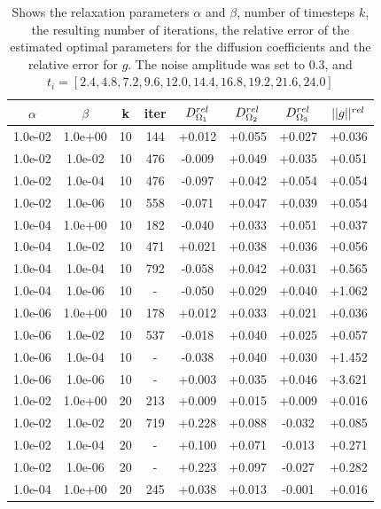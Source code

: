 \documentclass[12pt,a4paper]{article}
\begin{document}
\begin{table}[t]
\centering
\caption{Shows the relaxation parameters $\alpha$ and $\beta$, number of timesteps $k$, the resulting number of iterations, the relative error of the estimated optimal parameters for the diffusion coefficients and the relative error for $g$. The noise amplitude was set to 0.3, and $t_i =[2.4, 4.8, 7.2, 9.6, 12.0, 14.4, 16.8, 19.2, 21.6, 24.0]$  }
\begin{tabular}{*{8}c}
$\alpha$ & $\beta$ & k  & iter & $ D_{\Omega_1}\sp{rel}$ & $D_{\Omega_2}\sp{rel} $ & $D_{\Omega_3}\sp{rel} $ & $||g||\sp{rel} $ \\
\hline
 1.0e-02 	 & 1.0e+00 	 & 10 & 144 	 & +0.012 & +0.055 & +0.027 & +0.036 \\ 
 1.0e-02 	 & 1.0e-02 	 & 10 & 476 	 & -0.009 & +0.049 & +0.035 & +0.051 \\ 
 1.0e-02 	 & 1.0e-04 	 & 10 & 476 	 & -0.097 & +0.042 & +0.054 & +0.054 \\ 
 1.0e-02 	 & 1.0e-06 	 & 10 & 558 	 & -0.071 & +0.047 & +0.039 & +0.054 \\ 
 1.0e-04 	 & 1.0e+00 	 & 10 & 182 	 & -0.040 & +0.033 & +0.051 & +0.037 \\ 
 1.0e-04 	 & 1.0e-02 	 & 10 & 471 	 & +0.021 & +0.038 & +0.036 & +0.056 \\ 
 1.0e-04 	 & 1.0e-04 	 & 10 & 792 	 & -0.058 & +0.042 & +0.031 & +0.565 \\ 
 1.0e-04 	 & 1.0e-06 	 & 10 &  -   & -0.050 & +0.029 & +0.040 & +1.062 \\ 
 1.0e-06 	 & 1.0e+00 	 & 10 & 178 	 & +0.012 & +0.033 & +0.021 & +0.036 \\ 
 1.0e-06 	 & 1.0e-02 	 & 10 & 537 	 & -0.018 & +0.040 & +0.025 & +0.057 \\ 
 1.0e-06 	 & 1.0e-04 	 & 10 &  -	 & -0.038 & +0.040 & +0.030 & +1.452 \\ 
 1.0e-06 	 & 1.0e-06 	 & 10 &  - 	 & +0.003 & +0.035 & +0.046 & +3.621 \\ 
 1.0e-02 	 & 1.0e+00 	 & 20 & 213 	 & +0.009 & +0.015 & +0.009 & +0.016 \\ 
 1.0e-02 	 & 1.0e-02 	 & 20 & 719 	 & +0.228 & +0.088 & -0.032 & +0.085 \\ 
 1.0e-02 	 & 1.0e-04 	 & 20 &  -   & +0.100 & +0.071 & -0.013 & +0.271 \\ 
 1.0e-02 	 & 1.0e-06 	 & 20 &   -  & +0.223 & +0.097 & -0.027 & +0.282 \\ 
 1.0e-04 	 & 1.0e+00 	 & 20 & 245 	 & +0.038 & +0.013 & -0.001 & +0.016 \\ 

\end{tabular}
\end{table}
\end{document}
